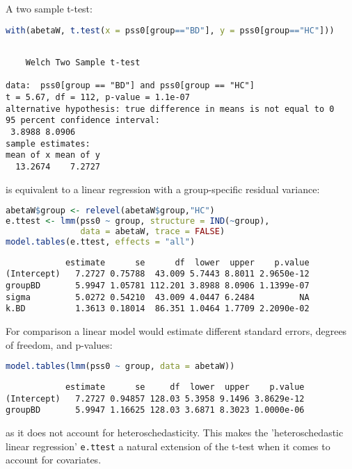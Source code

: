\documentclass[12pt]{article}
\begin{document}
A two sample t-test:
\begin{lstlisting}[language=r,numbers=none]
with(abetaW, t.test(x = pss0[group=="BD"], y = pss0[group=="HC"]))
\end{lstlisting}

\label{}
\begin{verbatim}

	Welch Two Sample t-test

data:  pss0[group == "BD"] and pss0[group == "HC"]
t = 5.67, df = 112, p-value = 1.1e-07
alternative hypothesis: true difference in means is not equal to 0
95 percent confidence interval:
 3.8988 8.0906
sample estimates:
mean of x mean of y 
  13.2674    7.2727
\end{verbatim}

is equivalent to a linear regression with a group-specific residual
variance:
\begin{lstlisting}[language=r,numbers=none]
abetaW$group <- relevel(abetaW$group,"HC")
e.ttest <- lmm(pss0 ~ group, structure = IND(~group), 
               data = abetaW, trace = FALSE)
model.tables(e.ttest, effects = "all")
\end{lstlisting}

\label{}
\begin{verbatim}
            estimate      se      df  lower  upper    p.value
(Intercept)   7.2727 0.75788  43.009 5.7443 8.8011 2.9650e-12
groupBD       5.9947 1.05781 112.201 3.8988 8.0906 1.1399e-07
sigma         5.0272 0.54210  43.009 4.0447 6.2484         NA
k.BD          1.3613 0.18014  86.351 1.0464 1.7709 2.2090e-02
\end{verbatim}


\noindent For comparison a linear model would estimate different standard
errors, degrees of freedom, and p-values:
\begin{lstlisting}[language=r,numbers=none]
model.tables(lmm(pss0 ~ group, data = abetaW))
\end{lstlisting}

\label{}
\begin{verbatim}
            estimate      se     df  lower  upper    p.value
(Intercept)   7.2727 0.94857 128.03 5.3958 9.1496 3.8629e-12
groupBD       5.9947 1.16625 128.03 3.6871 8.3023 1.0000e-06
\end{verbatim}


as it does not account for heteroschedasticity. This makes the
'heteroschedastic linear regression' \texttt{e.ttest} a natural extension of
the t-test when it comes to account for covariates.
\end{document}
